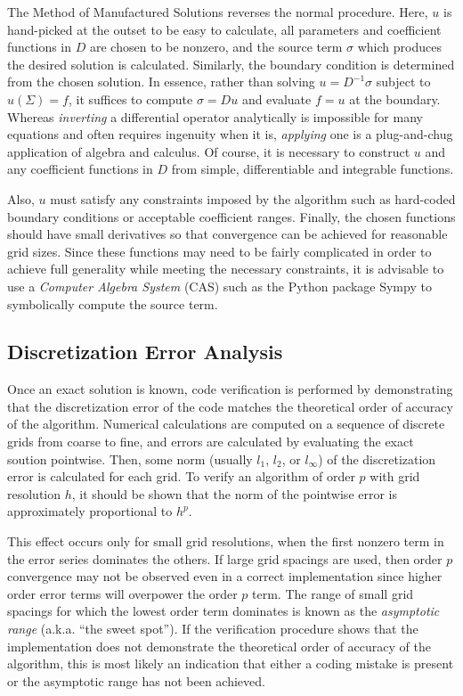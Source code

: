 The Method of Manufactured Solutions reverses the normal procedure.
Here, $u$ is hand-picked at the outset to be easy to calculate, all parameters and coefficient functions in $D$ are chosen to be nonzero, and the source term $\sigma$ which produces the desired solution is calculated.
Similarly, the boundary condition is determined from the chosen solution.
In essence, rather than solving $u = D^{-1}\sigma$ subject to $u(\Sigma)=f$, it suffices to compute $\sigma = Du$ and evaluate $f=u$ at the boundary.
Whereas \textit{inverting} a differential operator analytically is impossible for many equations and often requires ingenuity when it is, \textit{applying} one is a plug-and-chug application of algebra and calculus.
Of course, it is necessary to construct $u$ and any coefficient functions in $D$ from simple, differentiable and integrable functions.

Also, $u$ must satisfy any constraints imposed by the algorithm such as hard-coded boundary conditions or acceptable coefficient ranges.
Finally, the chosen functions should have small derivatives so that convergence can be achieved for reasonable grid sizes.
Since these functions may need to be fairly complicated in order to achieve full generality while meeting the necessary constraints, it is advisable to use a \textit{Computer Algebra System} (CAS) such as the Python package Sympy to symbolically compute the source term. %

\subsection{Discretization Error Analysis}
Once an exact solution is known, code verification is performed by demonstrating that the discretization error of the code matches the theoretical order of accuracy of the algorithm.
Numerical calculations are computed on a sequence of discrete grids from coarse to fine, and errors are calculated by evaluating the exact soution pointwise.
Then, some norm (usually $l_1$, $l_2$, or $l_\infty$) of the discretization error is calculated for each grid.
To verify an algorithm of order $p$ with grid resolution $h$, it should be shown that the norm of the pointwise error is approximately proportional to $h^p$.

This effect occurs only for small grid resolutions, when the first nonzero term in the error series dominates the others.
If large grid spacings are used, then order $p$ convergence may not be observed even in a correct implementation since higher order error terms will overpower the order $p$ term.
The range of small grid spacings for which the lowest order term dominates is known as the \textit{asymptotic range} (a.k.a. ``the sweet spot'').
If the verification procedure shows that the implementation does not demonstrate the theoretical order of accuracy of the algorithm, this is most likely an indication that either a coding mistake is present or the asymptotic range has not been achieved. %


